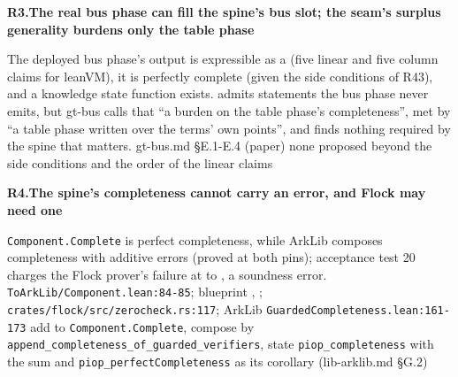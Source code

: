\par\medskip\noindent\textbf{R3.}\enspace\textbf{The real bus phase can fill the spine's bus slot; the seam's surplus generality burdens only the table phase}\par\nopagebreak
{} The deployed bus phase's output is expressible as a  (five linear and five column claims for leanVM), it is perfectly complete (given the side conditions of R43), and a knowledge state function exists.  admits statements the bus phase never emits, but gt-bus calls that ``a burden on the table phase's completeness'', met by ``a table phase written over the terms' own points'', and finds nothing required by the spine that matters.
 gt-bus.md §E.1-E.4 (paper)
 none proposed beyond the side conditions and the order of the linear claims

\par\medskip\noindent\textbf{R4.}\enspace\textbf{The spine's completeness cannot carry an error, and Flock may need one}\par\nopagebreak
{} \texttt{Component.\allowbreak{}Complete} is perfect completeness, while ArkLib composes completeness with additive errors (proved at both pins); acceptance test 20 charges the Flock prover's failure at  to , a soundness error.
 \texttt{To\allowbreak{}Ark\allowbreak{}Lib/\allowbreak{}Component.\allowbreak{}lean:\allowbreak{}84-\allowbreak{}85}; blueprint , ; \texttt{crates/\allowbreak{}flock/\allowbreak{}src/\allowbreak{}zerocheck.\allowbreak{}rs:\allowbreak{}117}; ArkLib \texttt{Guarded\allowbreak{}Completeness.\allowbreak{}lean:\allowbreak{}161-\allowbreak{}173}
 add  to \texttt{Component.\allowbreak{}Complete}, compose by \texttt{append\_\allowbreak{}completeness\_\allowbreak{}of\_\allowbreak{}guarded\_\allowbreak{}verifiers}, state \texttt{piop\_\allowbreak{}completeness} with the sum and \texttt{piop\_\allowbreak{}perfect\allowbreak{}Completeness} as its corollary (lib-arklib.md §G.2)


